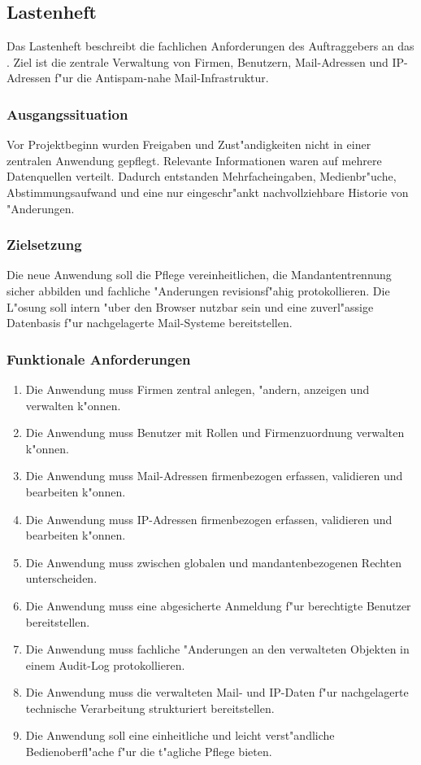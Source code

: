 \subsection{Lastenheft}
\label{app:Lastenheft}

Das Lastenheft beschreibt die fachlichen Anforderungen des Auftraggebers an das
. Ziel ist die zentrale Verwaltung von
Firmen, Benutzern, Mail-Adressen und IP-Adressen f"ur die
Antispam-nahe Mail-Infrastruktur.

\subsubsection*{Ausgangssituation}
Vor Projektbeginn wurden Freigaben und Zust"andigkeiten nicht in einer
zentralen Anwendung gepflegt. Relevante Informationen waren auf mehrere
Datenquellen verteilt. Dadurch entstanden Mehrfacheingaben, Medienbr"uche,
Abstimmungsaufwand und eine nur eingeschr"ankt nachvollziehbare Historie von
"Anderungen.

\subsubsection*{Zielsetzung}
Die neue Anwendung soll die Pflege vereinheitlichen, die
Mandantentrennung sicher abbilden und fachliche "Anderungen revisionsf"ahig
protokollieren. Die L"osung soll intern "uber den Browser nutzbar sein und eine
zuverl"assige Datenbasis f"ur nachgelagerte Mail-Systeme bereitstellen.

\subsubsection*{Funktionale Anforderungen}
\begin{enumerate}
\item Die Anwendung muss Firmen zentral anlegen, "andern, anzeigen und
      verwalten k"onnen.
\item Die Anwendung muss Benutzer mit Rollen und Firmenzuordnung
      verwalten k"onnen.
\item Die Anwendung muss Mail-Adressen firmenbezogen erfassen, validieren
      und bearbeiten k"onnen.
\item Die Anwendung muss IP-Adressen firmenbezogen erfassen, validieren
      und bearbeiten k"onnen.
\item Die Anwendung muss zwischen globalen und mandantenbezogenen Rechten
      unterscheiden.
\item Die Anwendung muss eine abgesicherte Anmeldung f"ur berechtigte Benutzer
      bereitstellen.
\item Die Anwendung muss fachliche "Anderungen an den verwalteten Objekten in
      einem Audit-Log protokollieren.
\item Die Anwendung muss die verwalteten Mail- und IP-Daten f"ur nachgelagerte
      technische Verarbeitung strukturiert bereitstellen.
\item Die Anwendung soll eine einheitliche und leicht verst"andliche
      Bedienoberfl"ache f"ur die t"agliche Pflege bieten.
\end{enumerate}

